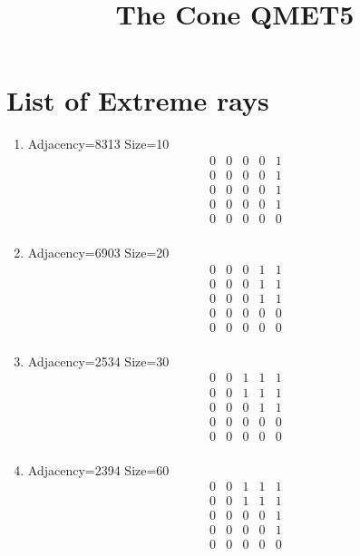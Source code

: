 \documentclass[12pt]{article}
\title{The Cone QMET5}
\begin{document}
\maketitle


\section{List of Extreme rays}
\begin{multicols}{3}
\begin{enumerate}
\item Adjacency=8313 Size=10
\begin{equation*}
\begin{array}{ccccc}
0&0&0&0&1\\
0&0&0&0&1\\
0&0&0&0&1\\
0&0&0&0&1\\
0&0&0&0&0\\
\end{array}
\end{equation*}
\item Adjacency=6903 Size=20
\begin{equation*}
\begin{array}{ccccc}
0&0&0&1&1\\
0&0&0&1&1\\
0&0&0&1&1\\
0&0&0&0&0\\
0&0&0&0&0\\
\end{array}
\end{equation*}
\item Adjacency=2534 Size=30
\begin{equation*}
\begin{array}{ccccc}
0&0&1&1&1\\
0&0&1&1&1\\
0&0&0&1&1\\
0&0&0&0&0\\
0&0&0&0&0\\
\end{array}
\end{equation*}
\item Adjacency=2394 Size=60
\begin{equation*}
\begin{array}{ccccc}
0&0&1&1&1\\
0&0&1&1&1\\
0&0&0&0&1\\
0&0&0&0&1\\
0&0&0&0&0\\

\end{array}
\end{equation*}
\end{enumerate}
\end{multicols}
\end{document}
